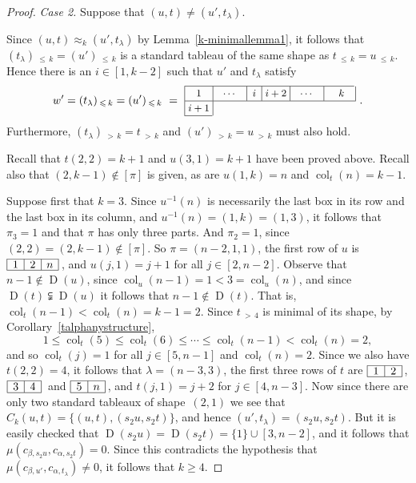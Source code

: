 \documentclass[ALCO,ThmDefs,Unicode,epreuves]{cedram}
\newenvironment{Case}[1]{\smallskip\noindent\emph{Case #1}\endgraf
 \nobreak\noindent\ignorespaces}{\endgraf\smallskip}
\DeclareMathOperator{\col}{col}
\newcommand{\morethan}[2]{#1\,{_{>\,#2}}}
\newcommand{\Lessthan}[2]{#1\,{_{\leqslant\,#2}}}
\DeclareMathOperator{\D}{D}
\begin{document}
\begin{proof}
\begin{Case}{2. } Suppose that $(u,t)\neq(u',t_\lambda)$.

Since $(u,t)\approx_k(u',t_\lambda)$ by Lemma~\ref{k-minimallemma1}, it follows that
$\Lessthan {(t_\lambda)}{k}=\Lessthan {(u')}k$ is a standard tableau of the same shape as
$\Lessthan {t}{k}=\Lessthan {u}k$. Hence there is an $i\in[1,k-2]$
such that $u'$ and $t_\lambda$ satisfy
\[
w'=\Lessthan {(t_\lambda)}{k}=\Lessthan {(u')}k\ =\ \vcenter{\offinterlineskip\small
\hbox{\vrule height 0.4 pt depth0 pt width 152.4pt}
\hbox{\vrule height 9 pt depth 4 pt\hbox to 25pt{\hfil$1$\hfil}\vrule
\hbox to 30pt{\hfil$\cdots$\hfil}\vrule\hbox to 13pt{\hfil$i$\hfil}\vrule
\hbox to 25pt{\hfil$i+2$\hfil}\vrule\hbox to 30pt{\hfil$\cdots$\hfil}\vrule\
\hbox to 25pt{\hfil$k$\hfil}\vrule}
\hrule
\hbox{\vrule height 9 pt depth 4 pt\hbox to 25pt{\hfil$i+1$\hfil}\vrule}
\hrule width 25 pt}\ .
\]
Furthermore, $\morethan {(t_\lambda)}k=\morethan tk$ and $\morethan {(u')}k=\morethan uk$
must also hold.

Recall that $t(2,2)=k+1$ and $u(3,1)=k+1$ have been proved above. Recall also that
$(2,k-1)\notin[\pi]$ is given, as are $u(1,k)=n$ and $\col_t(n)=k-1$.

Suppose first that $k=3$. Since $u^{-1}(n)$ is necessarily the last box
in its row and the last box in its column, and $u^{-1}(n)=(1,k)=(1,3)$,
it follows that $\pi_3=1$ and that $\pi$ has only three parts. And $\pi_2=1$, since
$(2,2)=(2,k-1)\notin[\pi]$. So $\pi=(n-2,1,1)$, the first row of $u$ is
$\vcenter{\offinterlineskip
\hrule
\hbox{\vrule height 8 pt depth 2 pt\hbox to 15pt{\hfil$1$\hfil}\vrule
\hbox to 15pt{\hfil$2$\hfil}\vrule
\hbox to 15pt{\hfil$n$\hfil}\vrule}
\hrule}\,$,
and $u(j,1)=j+1$ for all $j\in[2, n-2]$. Observe that $n-1\notin\D(u)$, since
$\col_u(n-1)=1<3=\col_u(n)$, and since $\D(t)\subsetneqq\D(u)$ it follows
that $n-1\notin\D(t)$. That is, $\col_t(n-1)<\col_t(n)=k-1=2$. Since $\morethan t4$ is
minimal of its shape, by Corollary~\ref{talphanystructure},
\[
1\leqslant \col_t(5)\leqslant\col_t(6)\leqslant\cdots\leqslant\col_t(n-1)<\col_t(n)=2,
\]
and so $\col_t(j)=1$ for all $j\in[5,n-1]$ and $\col_t(n)=2$. Since we also
have $t(2,2)=4$, it follows that $\lambda=(n-3,3)$, the first three rows of $t$ are
$\vcenter{\offinterlineskip
\hrule
\hbox{\vrule height 8 pt depth 2 pt\hbox to 15pt{\hfil$1$\hfil}\vrule
\hbox to 15pt{\hfil$2$\hfil}\vrule}
\hrule}\,$,
$\vcenter{\offinterlineskip
\hrule
\hbox{\vrule height 8 pt depth 2 pt\hbox to 15pt{\hfil$3$\hfil}\vrule
\hbox to 15pt{\hfil$4$\hfil}\vrule}
\hrule}\,$
and
$\vcenter{\offinterlineskip
\hrule
\hbox{\vrule height 8 pt depth 2 pt\hbox to 15pt{\hfil$5$\hfil}\vrule
\hbox to 15pt{\hfil$n$\hfil}\vrule}
\hrule}\,$, and $t(j,1)=j+2$ for $j\in [4, n-3]$. Now since there are only
two standard tableaux of shape~$(2,1)$ we see that $C_k(u,t)=\{(u,t),(s_2u,s_2t)\}$,
and hence $(u',t_\lambda)=(s_2u,s_2t)$. But it is easily checked that
$\D(s_2u)=\D(s_2t)=\{1\}\cup[3,n-2]$, and it follows that
$\mu(c_{\beta,s_2u},c_{\alpha,s_2t})=0$. Since this contradicts the hypothesis
that $\mu(c_{\beta,u'},c_{\alpha,t_\lambda})\neq 0$, it follows that $k\geqslant 4$.


\end{Case}
\end{proof}
\end{document}
